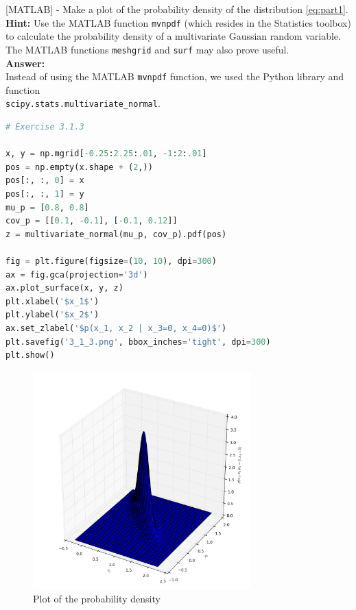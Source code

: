 \documentclass[a4paper]{article}
\begin{document}
[MATLAB] - Make a plot of the probability density of the distribution \ref{eq:part1}.\\

\textbf{Hint:} Use the MATLAB function \texttt{mvnpdf} (which resides in the Statistics toolbox) to calculate the probability density of a multivariate Gaussian random variable. The MATLAB functions \texttt{meshgrid} and \texttt{surf} may also prove useful.\\


\textbf{Answer:}\\

Instead of using the MATLAB \texttt{mvnpdf} function, we used the Python library and function\\ \texttt{scipy.stats.multivariate\_normal}.

\begin{lstlisting}[language=Python]
# Exercise 3.1.3

x, y = np.mgrid[-0.25:2.25:.01, -1:2:.01]
pos = np.empty(x.shape + (2,))
pos[:, :, 0] = x
pos[:, :, 1] = y
mu_p = [0.8, 0.8]
cov_p = [[0.1, -0.1], [-0.1, 0.12]]
z = multivariate_normal(mu_p, cov_p).pdf(pos)

fig = plt.figure(figsize=(10, 10), dpi=300)
ax = fig.gca(projection='3d')
ax.plot_surface(x, y, z)
plt.xlabel('$x_1$')
plt.ylabel('$x_2$')
ax.set_zlabel('$p(x_1, x_2 | x_3=0, x_4=0)$')
plt.savefig('3_1_3.png', bbox_inches='tight', dpi=300)
plt.show()
\end{lstlisting}

\begin{figure}[H]
\center
\includegraphics[width=0.75\textwidth]{Images/3_1_3.png}
\caption{Plot of the probability density}
\label{Fig3.1.3}
\end{figure}
\end{document}
